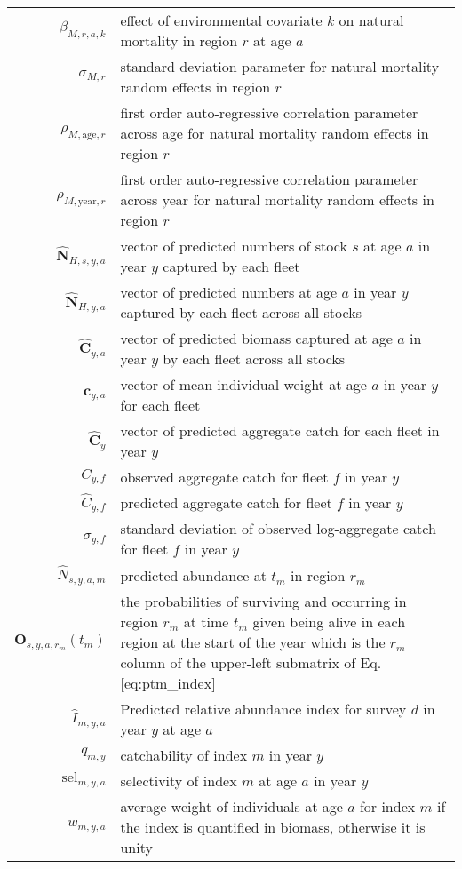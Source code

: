 \begin{longtable}[c]{r p{}}
$\beta_{M,r,a,k}$ & effect of environmental covariate $k$ on natural mortality in region $r$ at age $a$\\
$\sigma_{M,r}$ & standard deviation parameter for natural mortality random effects in region $r$\\
$\rho_{M,\text{age},r}$ & first order auto-regressive correlation parameter across age for natural mortality random effects in region $r$\\
$\rho_{M,\text{year},r}$ & first order auto-regressive correlation parameter across year for natural mortality random effects in region $r$\\
$\widehat{\mathbf{N}}_{H,s,y,a}$ & vector of predicted numbers of stock $s$ at age $a$ in year $y$ captured by each fleet\\
$\widehat{\mathbf{N}}_{H,y,a}$ & vector of predicted numbers at age $a$ in year $y$ captured by each fleet across all stocks\\
$\widehat{\mathbf{C}}_{y,a}$ & vector of predicted biomass captured at age $a$ in year $y$ by each fleet across all stocks\\
$\mathbf{c}_{y,a}$ & vector of mean individual weight at age $a$ in year $y$ for each fleet\\
$\widehat{\mathbf{C}}_y$ & vector of predicted aggregate catch for each fleet in year $y$\\
$C_{y,f}$ & observed aggregate catch for fleet $f$ in year $y$\\
$\widehat C_{y,f}$ & predicted aggregate catch for fleet $f$ in year $y$\\
$\sigma_{y,f}$ & standard deviation of observed log-aggregate catch for fleet $f$ in year $y$\\
$\widehat{N}_{s,y,a,m}$ & predicted abundance at $t_m$ in region $r_m$\\
$\mathbf{O}_{s,y,a,r_m}(t_m)$ & the probabilities of surviving and occurring in region $r_m$ at time $t_m$ given being alive in each region at the start of the year which is the $r_m$ column of the upper-left submatrix of Eq. \ref{eq:ptm_index}\\
$\widehat I_{m,y,a}$ & Predicted relative abundance index for survey $d$ in year $y$ at age $a$ \\
$q_{m,y}$ & catchability of index $m$ in year $y$\\
$\text{sel}_{m,y,a}$ &  selectivity of index $m$ at age $a$ in year $y$ \\
$w_{m,y,a}$ & average weight of individuals at age $a$ for index $m$ if the index is quantified in biomass, otherwise it is unity\\

\end{longtable}

